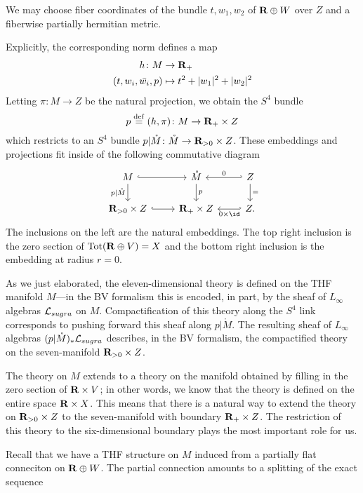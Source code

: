 
We may choose fiber coordinates of the bundle $t, w_{1}, w_{2}$ of $\mathbf{R} \oplus W$ over $Z$ and a fiberwise partially hermitian metric.

Explicitly, the corresponding norm defines a map
\begin{align*}
 h \colon  M & \to \mathbf{R}_{+} \\
  (t, w_{i}, \bar{w_{i}}, p)& \mapsto t^{2} + |w_{1}|^{2}+|w_{2}|^{2}
\end{align*}
Letting $\pi \colon M \to Z$ be the natural projection, we obtain the $S^{4}$ bundle
\[
p \overset{\rm def}{=} (h,\pi) \colon M \to \mathbf{R}_{+}\times Z
\]
which restricts to an $S^4$ bundle $p|\mathring {M} \colon \mathring{M} \to \mathbf{R}_{>0} \times Z$.
These embeddings and projections fit inside of the following commutative diagram
\[
\begin{tikzcd}
M \ar[d,"p|\mathring M"'] \ar[r,hook] & \mathring{M} \ar[d,"p"] & \ar[l,hook',"0"'] Z \ar[d,"="] \\
\R_{>0} \times Z \ar[r,hook] & \R_{+} \times Z & \ar[l,hook',"0 \times \id"] Z.
\end{tikzcd}
\]
The inclusions on the left are the natural embeddings.
The top right inclusion is the zero section of ${\rm Tot}(\mathbf{R} \oplus V) = X$ and the bottom right inclusion is the embedding at radius $r = 0$.

As we just elaborated, the eleven-dimensional theory is defined on the THF manifold $M$---in the BV formalism this is encoded, in part, by the sheaf of $L_\infty$ algebras $\mathcal L_{sugra}$ on $M$.
Compactification of this theory along the $S^4$ link corresponds to pushing forward this sheaf along $p|\mathring M$.
The resulting sheaf of $L_\infty$ algebras $(p|\mathring M)_*\mathcal L_{sugra}$ describes, in the BV formalism, the compactified theory on the seven-manifold $\mathbf{R}_{>0} \times Z$.

The theory on $M$ extends to a theory on the manifold obtained by filling in the zero section of $\mathbf{R} \times V$; in other words, we know that the theory is defined on the entire space $\mathbf{R} \times X$.
This means that there is a natural way to extend the theory on $\mathbf{R}_{>0} \times Z$ to the seven-manifold with boundary $\mathbf{R}_{+} \times Z$.
The restriction of this theory to the six-dimensional boundary plays the most important role for us.

Recall that we have a THF structure on $M$ induced from a partially flat conneciton on $\mathbf{R}\oplus W$. The partial connection amounts to a splitting of the exact sequence

